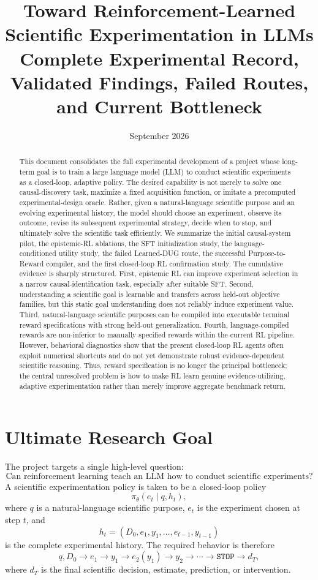 \documentclass[11pt]{article}
\title{Toward Reinforcement-Learned Scientific Experimentation in LLMs\\\large Complete Experimental Record, Validated Findings, Failed Routes, and Current Bottleneck}
\author{}
\date{September 2026}
\begin{document}
\maketitle

\begin{abstract}
This document consolidates the full experimental development of a project whose long-term goal is to train a large language model (LLM) to conduct scientific experiments as a closed-loop, adaptive policy. The desired capability is not merely to solve one causal-discovery task, maximize a fixed acquisition function, or imitate a precomputed experimental-design oracle. Rather, given a natural-language scientific purpose and an evolving experimental history, the model should choose an experiment, observe its outcome, revise its subsequent experimental strategy, decide when to stop, and ultimately solve the scientific task efficiently. We summarize the initial causal-system pilot, the epistemic-RL ablations, the SFT initialization study, the language-conditioned utility study, the failed Learned-DUG route, the successful Purpose-to-Reward compiler, and the first closed-loop RL confirmation study. The cumulative evidence is sharply structured. First, epistemic RL can improve experiment selection in a narrow causal-identification task, especially after suitable SFT. Second, understanding a scientific goal is learnable and transfers across held-out objective families, but this static goal understanding does not reliably induce experiment value. Third, natural-language scientific purposes can be compiled into executable terminal reward specifications with strong held-out generalization. Fourth, language-compiled rewards are non-inferior to manually specified rewards within the current RL pipeline. However, behavioral diagnostics show that the present closed-loop RL agents often exploit numerical shortcuts and do not yet demonstrate robust evidence-dependent scientific reasoning. Thus, reward specification is no longer the principal bottleneck; the central unresolved problem is how to make RL learn genuine evidence-utilizing, adaptive experimentation rather than merely improve aggregate benchmark return.
\end{abstract}

\section{Ultimate Research Goal}
The project targets a single high-level question:
\[
\boxed{\text{Can reinforcement learning teach an LLM how to conduct scientific experiments?}}
\]
A scientific experimentation policy is taken to be a closed-loop policy
\[
\pi_\theta(e_t\mid q,h_t),
\]
where $q$ is a natural-language scientific purpose, $e_t$ is the experiment chosen at step $t$, and
\[
h_t=(D_0,e_1,y_1,\ldots,e_{t-1},y_{t-1})
\]
is the complete experimental history. The required behavior is therefore
\[
q,D_0
\rightarrow e_1
\rightarrow y_1
\rightarrow e_2(y_1)
\rightarrow y_2
\rightarrow \cdots
\rightarrow \texttt{STOP}
\rightarrow d_T,
\]
where $d_T$ is the final scientific decision, estimate, prediction, or intervention.
\end{document}
